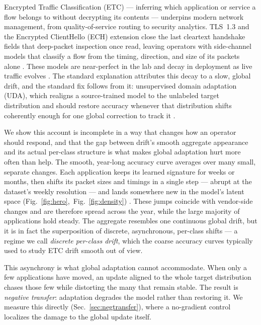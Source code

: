 Encrypted Traffic Classification (ETC) --- inferring which application or service a
flow belongs to without decrypting its contents --- underpins modern network
management, from quality-of-service routing to security analytics. TLS~1.3 and the
Encrypted ClientHello (ECH) extension close the last cleartext handshake fields that
deep-packet inspection once read, leaving operators with side-channel models that
classify a flow from the timing, direction, and size of its packets alone
\cite{shamsimukhametov2024ech,lin2022etbert,luxemburk2023tls,seddigh2019framework}.
These models are near-perfect in the lab and decay in deployment as live traffic
evolves \cite{pendlebury2019tesseract,bahramali2023netclr}. The standard explanation
attributes this decay to a slow, global drift, and the standard fix follows from it:
unsupervised domain adaptation (UDA), which realigns a source-trained model to the
unlabeled target distribution and should restore accuracy whenever that distribution
shifts coherently enough for one global correction to track it
\cite{wang2020tent,wang2022cotta,ganin2016dann,li2016adabn}.

We show this account is incomplete in a way that changes how an operator should
respond, and that the gap between drift's smooth aggregate appearance and its actual
per-class structure is what makes global adaptation hurt more often than help. The
smooth, year-long accuracy curve averages over many small, separate changes. Each
application keeps its learned signature for weeks or months, then
shifts its packet sizes and timings in a single step --- abrupt at the dataset's
weekly resolution --- and lands somewhere new in the model's latent space
(Fig.~\ref{fig:hero},~Fig.~\ref{fig:density}) \cite{jancicka2024noms}. These jumps
coincide with vendor-side changes and are therefore spread across the year, while
the large majority of applications hold steady. The aggregate resembles one
continuous global drift, but it is in fact the superposition of discrete,
asynchronous, per-class shifts --- a regime we call \emph{discrete per-class drift},
which the coarse accuracy curves typically used to study ETC drift smooth out of
view.

This asynchrony is what global adaptation cannot accommodate. When only a few
applications have moved, an update aligned to the whole target distribution chases
those few while distorting the many that remain stable. The result is \emph{negative
transfer}: adaptation degrades the model rather than restoring it. We measure this
directly (Sec.~\ref{sec:negtransfer}), where a no-gradient control localizes the
damage to the global update itself.

